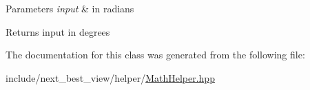 \begin{DoxyParams}{\-Parameters}
{\em input} & in radians \\
\hline
\end{DoxyParams}
\begin{DoxyReturn}{\-Returns}
input in degrees 
\end{DoxyReturn}


\-The documentation for this class was generated from the following file\-:\begin{DoxyCompactItemize}
\item 
include/next\-\_\-best\-\_\-view/helper/\hyperlink{MathHelper_8hpp}{\-Math\-Helper.\-hpp}\end{DoxyCompactItemize}
